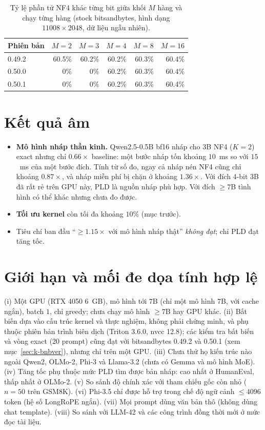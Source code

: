 \begin{table}[t]
\centering\small
\caption{Tỷ lệ phần tử NF4 khác từng bit giữa khối $M$ hàng và chạy từng hàng (stock bitsandbytes, hình dạng $11008{\times}2048$, dữ liệu ngẫu nhiên).}\label{tab:k-bnbver}
\begin{tabular}{@{}lrrrrr@{}}
\toprule
Phiên bản & $M{=}2$ & $M{=}3$ & $M{=}4$ & $M{=}8$ & $M{=}16$\\\midrule
0.49.2 & 60.5\% & 60.2\% & 60.2\% & 60.3\% & 60.4\%\\
0.50.0 & 0\% & 0\% & 60.2\% & 60.3\% & 60.4\%\\
0.50.1 & 0\% & 0\% & 60.2\% & 60.3\% & 60.4\%\\
\bottomrule
\end{tabular}
\end{table}

\section{Kết quả âm}\label{sec:k-neg}
\begin{itemize}[nosep]
\item \textbf{Mô hình nháp thần kinh.} Qwen2.5-0.5B bf16 nháp cho 3B NF4 ($K{=}2$) exact nhưng chỉ $0.66\times$ baseline: một bước nháp tốn khoảng $10$~ms so với $15$~ms của một bước đích. Tính từ số đo, ngay cả nháp nén NF4 cũng chỉ khoảng $0.87\times$, và nháp miễn phí bị chặn ở khoảng $1.36\times$. Với đích 4-bit $3$B đã rất rẻ trên GPU này, PLD là nguồn nháp phù hợp. Với đích $\ge7$B tình hình có thể khác nhưng chưa đo được.
\item \textbf{Tối ưu kernel} còn tối đa khoảng $10\%$ (mục trước).
\item Tiêu chí ban đầu ``$\ge1.15\times$ với mô hình nháp thật'' \emph{không đạt}; chỉ PLD đạt tăng tốc.
\end{itemize}

\section{Giới hạn và mối đe dọa tính hợp lệ}\label{sec:k-limits}
(i) Một GPU (RTX 4050 6~GB), mô hình tới $7$B (chỉ một mô hình $7$B, với cache ngắn), batch $1$, chỉ greedy; chưa chạy mô hình $\ge7$B hay GPU khác. (ii) Bất biến dựa vào cấu trúc kernel và thực nghiệm, không phải chứng minh, và phụ thuộc phiên bản trình biên dịch (Triton 3.6.0, nvcc 12.8); các kiểm tra bất biến và vòng exact (20 prompt) cũng đạt với bitsandbytes 0.49.2 và 0.50.1 (xem mục~\ref{sec:k-bnbver}), nhưng chỉ trên một GPU. (iii) Chưa thử họ kiến trúc nào ngoài Qwen2, OLMo-2, Phi-3 và Llama-3.2 (chưa có Gemma và mô hình MoE). (iv) Tăng tốc phụ thuộc mức PLD tìm được bản nháp: cao nhất ở HumanEval, thấp nhất ở OLMo-2. (v) So sánh độ chính xác với tham chiếu gốc còn nhỏ ($n{=}50$ trên GSM8K). (vi) Phi-3.5 chỉ được hỗ trợ trong chế độ ngữ cảnh $\le4096$ token (hệ số LongRoPE ngắn). (vii) Mọi prompt dùng văn bản thô (không dùng chat template). (viii) So sánh với LLM-42 và các công trình đồng thời mới ở mức đọc tài liệu.


